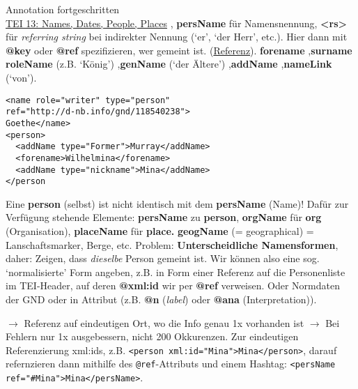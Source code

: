 \begin{frame}{Annotation fortgeschritten}
\footnotesize
{}\\
\href{http://www.tei-c.org/release/doc/tei-p5-doc/en/html/ND.html}{TEI 13: Names, Dates, People, Places} \sep 
\textbf{persName} für Namensnennung, \textbf{<rs>} für \emph{referring string} bei indirekter Nennung (`er', `der Herr', etc.). Hier dann mit \textbf{@key} oder \textbf{@ref} spezifizieren, wer gemeint ist. (\href{http://www.tei-c.org/release/doc/tei-p5-doc/en/html/CO.html#CONARS}{Referenz}). \textbf{forename} \sep \textbf{surname} \seo \textbf{roleName} (z.B. `König') \sep  \textbf{genName} (`der Ältere') \sep \textbf{addName} \sep \textbf{nameLink} (`von').

\begin{verbatim}
<name role="writer" type="person"
ref="http://d-nb.info/gnd/118540238">
Goethe</name>
<person>
  <addName type="Former">Murray</addName>
  <forename>Wilhelmina</forename>
  <addName type="nickname">Mina</addName>
</person
\end{verbatim}

Eine \textbf{person} (selbst) ist nicht identisch mit dem \textbf{persName} (Name)! Dafür zur Verfügung stehende Elemente: \textbf{persName} zu \textbf{person}, \textbf{orgName} für \textbf{org} (Organisation), \textbf{placeName} für \textbf{place.} \textbf{geogName} (= geographical) = Lanschaftsmarker, Berge, etc.
Problem: \textbf{Unterscheidliche Namensformen}, daher:
 Zeigen, dass \emph{dieselbe} Person gemeint ist. Wir können also eine sog. `normalisierte' Form angeben, z.B. in Form einer Referenz auf die Personenliste im TEI-Header, auf deren \textbf{@xml:id} wir per \textbf{@ref} verweisen. Oder Normdaten der GND oder in Attribut (z.B. \textbf{@n} (\emph{label}) oder \textbf{@ana} (Interpretation)). 

 $\to$ Referenz auf eindeutigen Ort, wo die Info genau 1x vorhanden ist $\to$ Bei Fehlern nur 1x ausgebessern, nicht 200 Okkurenzen. Zur eindeutigen Referenzierung xml:ids, z.B. \verb|<person xml:id="Mina">Mina</person>|, darauf refernzieren dann mithilfe des \texttt{@ref}-Attributs und einem Hashtag: \verb|<persName ref="#Mina">Mina</persName>|.

\end{frame}


